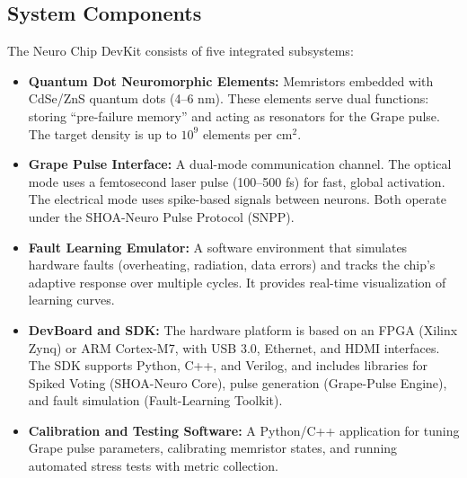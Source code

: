 \documentclass[12pt]{article}
\begin{document}
\subsection{System Components}
The Neuro Chip DevKit consists of five integrated subsystems:
\begin{itemize}
    \item \textbf{Quantum Dot Neuromorphic Elements:} Memristors embedded with CdSe/ZnS quantum dots (4--6 nm). These elements serve dual functions: storing ``pre-failure memory'' and acting as resonators for the Grape pulse. The target density is up to $10^9$ elements per cm$^2$.
    \item \textbf{Grape Pulse Interface:} A dual-mode communication channel. The optical mode uses a femtosecond laser pulse (100--500 fs) for fast, global activation. The electrical mode uses spike-based signals between neurons. Both operate under the SHOA-Neuro Pulse Protocol (SNPP).
    \item \textbf{Fault Learning Emulator:} A software environment that simulates hardware faults (overheating, radiation, data errors) and tracks the chip's adaptive response over multiple cycles. It provides real-time visualization of learning curves.
    \item \textbf{DevBoard and SDK:} The hardware platform is based on an FPGA (Xilinx Zynq) or ARM Cortex-M7, with USB 3.0, Ethernet, and HDMI interfaces. The SDK supports Python, C++, and Verilog, and includes libraries for Spiked Voting (SHOA-Neuro Core), pulse generation (Grape-Pulse Engine), and fault simulation (Fault-Learning Toolkit).
    \item \textbf{Calibration and Testing Software:} A Python/C++ application for tuning Grape pulse parameters, calibrating memristor states, and running automated stress tests with metric collection.
\end{itemize}
\end{document}

